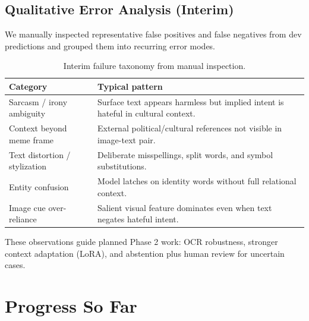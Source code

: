 \documentclass[11pt]{article}
\begin{document}
\subsection{Qualitative Error Analysis (Interim)}
We manually inspected representative false positives and false negatives from dev predictions and grouped them into recurring error modes.

\begin{table}[h]
\centering
\small
\caption{Interim failure taxonomy from manual inspection.}
\begin{tabularx}{\columnwidth}{lX}
\toprule
Category & Typical pattern \\
\midrule
Sarcasm / irony ambiguity & Surface text appears harmless but implied intent is hateful in cultural context. \\
Context beyond meme frame & External political/cultural references not visible in image-text pair. \\
Text distortion / stylization & Deliberate misspellings, split words, and symbol substitutions. \\
Entity confusion & Model latches on identity words without full relational context. \\
Image cue over-reliance & Salient visual feature dominates even when text negates hateful intent. \\
\bottomrule
\end{tabularx}
\label{tab:failuretax}
\end{table}

These observations guide planned Phase 2 work: OCR robustness, stronger context adaptation (LoRA), and abstention plus human review for uncertain cases.

\section{Progress So Far}
\end{document}
